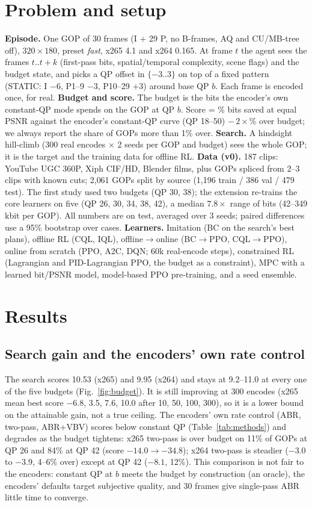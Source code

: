 \documentclass[conference,10pt]{IEEEtran}
\newcommand{\cqlppo}{CQL$\to$PPO}
\newcommand{\bcppo}{BC$\to$PPO}
\begin{document}
\section{Problem and setup}
\textbf{Episode.} One GOP of 30 frames (I + 29 P, no B-frames, AQ and CU/MB-tree off), $320{\times}180$, preset \emph{fast}, x265 4.1 and x264 0.165. At frame $t$ the agent sees the frames $t..t{+}k$ (first-pass bits, spatial/temporal complexity, scene flags) and the budget state, and picks a QP offset in $\{-3..3\}$ on top of a fixed pattern (STATIC: I $-6$, P1--9 $-3$, P10--29 $+3$) around base QP $b$. Each frame is encoded once, for real.
\textbf{Budget and score.} The budget is the bits the encoder's own constant-QP mode spends on the GOP at QP $b$. Score = \% bits saved at equal PSNR against the encoder's constant-QP curve (QP 18--50) $-\,2\times$\% over budget; we always report the share of GOPs more than 1\% over.
\textbf{Search.} A hindsight hill-climb (300 real encodes $\times$ 2 seeds per GOP and budget) sees the whole GOP; it is the target and the training data for offline RL.
\textbf{Data (v0).} 187 clips: YouTube UGC 360P, Xiph CIF/HD, Blender films, plus GOPs spliced from 2--3 clips with known cuts; 2{,}061 GOPs split by source (1{,}196 train / 386 val / 479 test). The first study used two budgets (QP 30, 38); the extension re-trains the core learners on five (QP 26, 30, 34, 38, 42), a median $7.8\times$ range of bits (42--349 kbit per GOP). All numbers are on test, averaged over 3 seeds; paired differences use a 95\% bootstrap over cases.
\textbf{Learners.} Imitation (BC on the search's best plans), offline RL (CQL, IQL), offline$\to$online (\bcppo, \cqlppo), online from scratch (PPO, A2C, DQN; 60k real-encode steps), constrained RL (Lagrangian and PID-Lagrangian PPO, the budget as a constraint), MPC with a learned bit/PSNR model, model-based PPO pre-training, and a seed ensemble.

\section{Results}
\subsection{Search gain and the encoders' own rate control}\label{sec:search}
The search scores 10.53 (x265) and 9.95 (x264) and stays at 9.2--11.0 at every one of the five budgets (Fig.~\ref{fig:budget}). It is still improving at 300 encodes (x265 mean best score $-6.8$, 3.5, 7.6, 10.0 after 10, 50, 100, 300), so it is a lower bound on the attainable gain, not a true ceiling. The encoders' own rate control (ABR, two-pass, ABR+VBV) scores below constant QP (Table~\ref{tab:methods}) and degrades as the budget tightens: x265 two-pass is over budget on 11\% of GOPs at QP 26 and 84\% at QP 42 (score $-14.0\to-34.8$); x264 two-pass is steadier ($-3.0$ to $-3.9$, 4--6\% over) except at QP 42 ($-8.1$, 12\%). This comparison is not fair to the encoders: constant QP at $b$ meets the budget by construction (an oracle), the encoders' defaults target subjective quality, and 30 frames give single-pass ABR little time to converge.
\end{document}
